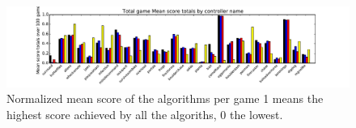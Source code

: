 \begin{figure}
	\centering
	\includegraphics[width=\textwidth]{includes/scores}
	\vspace{-.8cm}
	\caption{Normalized mean score of the algorithms per game 1 means the
	highest score achieved by all the algoriths, 0 the lowest.}
	\label{fig:scores}
\end{figure}
\begin{figure}
	\centering
\end{figure}
